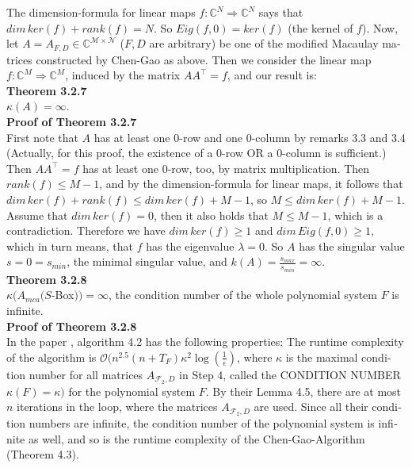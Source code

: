 \documentclass[a4paper,11pt]{article}
\begin{document}
\begin{otherlanguage}{english}
\noindent
The dimension-formula for linear maps $f: \mathbb{C}^N \Rightarrow \mathbb{C}^N$ says that $dim \, ker(f) + rank(f) = N$. So $Eig(f,0) = ker(f)$ (the kernel of $f$). Now, let $A = A_{F,D} \in \mathbb{C}^{\mathcal{M} \times \mathcal{N}}$ ($F,D$ are arbitrary) be one of the modified Macaulay matrices constructed by Chen-Gao as above. Then we consider the linear map $f: \mathbb{C}^M \Rightarrow \mathbb{C}^M$, induced by the matrix $AA^\intercal = f$, and our result is: \\

\noindent
\textbf{Theorem 3.2.7} \\
$\kappa(A)=\infty$. \\

\noindent
\textbf{Proof of Theorem 3.2.7} \\
First note that $A$ has at least one $0$-row and one $0$-column by remarks 3.3 and 3.4 (Actually, for this proof, the existence of a $0$-row OR a $0$-column is sufficient.) Then $AA^\intercal = f$ has at least one $0$-row, too, by matrix multiplication. Then $rank(f) \leq M-1$, and by the dimension-formula for linear maps, it follows that $dim \,ker(f) + rank(f) \leq dim \,ker(f) + M-1$, so $M \leq dim \,ker(f) + M-1$.\\
Assume that $dim \,ker(f) = 0$, then it also holds that $M \leq M-1$, which is a contradiction. Therefore we have $dim \,ker(f) \geq 1$ and  $dim \,Eig(f,0) \geq 1$, 
which in turn means, that $f$ has the eigenvalue $\lambda = 0$. So $A$ has the singular value $s = 0 = s_{min}$, the minimal singular value, and
$k(A) = \frac{s_{max}}{s_{min}} = \infty$. \\

\noindent
\textbf{Theorem 3.2.8} \\
$\kappa(A_{mca}(S$-Box$))=\infty$, the condition number of the whole polynomial system $F$ is infinite. \\

\noindent
\textbf{Proof of Theorem 3.2.8} \\
In the paper \cite{QAA}, algorithm 4.2 has the following properties: The runtime complexity of the algorithm is  $\mathcal{O}(n^{2.5}(n + T_F)\kappa^2 \log(\frac{1}{\epsilon})$, where $\kappa$ is the maximal condition number for all matrices $A_{\mathcal{F}_2,D}$ in Step $4$, called the CONDITION NUMBER $\kappa(F) = \kappa)$ for the polynomial system $F$. By their Lemma 4.5, there are at most $n$ iterations in the loop, where the matrices $A_{\mathcal{F}_2,D}$ are used. Since all their condition numbers are infinite, the condition number of the polynomial system is infinite as well, and so is the runtime complexity of the Chen-Gao-Algorithm (Theorem 4.3). \\


\end{otherlanguage}
\end{document}
